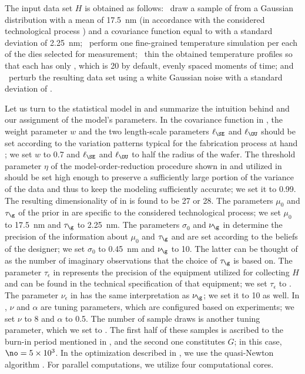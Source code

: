 The input data set $H$ is obtained as follows: \one~draw a sample of \g from a
Gaussian distribution with a mean of 17.5~nm (in accordance with the considered
technological process \cite{ptm}) and a covariance function equal to
 with a standard deviation of 2.25~nm; \two~perform one
fine-grained temperature simulation per each of the \hnd dies selected for
measurement; \three~thin the obtained temperature profiles so that each has only
\ns, which is 20 by default, evenly spaced moments of time; and \four~perturb
the resulting data set using a white Gaussian noise with a standard deviation of
.

Let us turn to the statistical model in  and
summarize the intuition behind and our assignment of the model's parameters. In
the covariance function in , the weight parameter $w$ and
the two length-scale parameters $\ell_\SE$ and $\ell_\OU$ should be set
according to the variation patterns typical for the fabrication process at hand
\cite{chandrakasan2000, cheng2011}; we set $w$ to 0.7 and $\ell_\SE$ and
$\ell_\OU$ to half the radius of the wafer. The threshold parameter $\eta$ of
the model-order-reduction procedure shown in  and utilized
in  should be set high enough to preserve a sufficiently
large portion of the variance of the data and thus to keep the modeling
sufficiently accurate; we set it to 0.99. The resulting dimensionality \nz of
\vz in  is found to be 27 or 28. The parameters $\mu_0$
and $\tau_\g$ of the prior in  are specific to the considered
technological process; we set $\mu_0$ to 17.5~nm and $\tau_\g$ to 2.25~nm. The
parameters $\sigma_0$ and $\nu_\g$ in  determine the precision
of the information about $\mu_0$ and $\tau_\g$ and are set according to the
beliefs of the designer; we set $\sigma_0$ to 0.45~nm and $\nu_\g$ to 10. The
latter can be thought of as the number of imaginary observations that the choice
of $\tau_\g$ is based on. The parameter $\tau_\epsilon$ in 
represents the precision of the equipment utilized for collecting $H$ and can be
found in the technical specification of that equipment; we set $\tau_\epsilon$
to . The parameter $\nu_\epsilon$ in  has the same
interpretation as $\nu_\g$; we set it to 10 as well. In ,
$\nu$ and $\alpha$ are tuning parameters, which are configured based on
experiments; we set $\nu$ to 8 and $\alpha$ to 0.5. The number of sample draws
is another tuning parameter, which we set to . The first half of
these samples is ascribed to the burn-in period mentioned in
, and the second one constitutes $G$; in this case,
$\no = 5 \times 10^3$. In the optimization described in
, we use the quasi-Newton algorithm \cite{press2007}.
For parallel computations, we utilize four computational cores.

